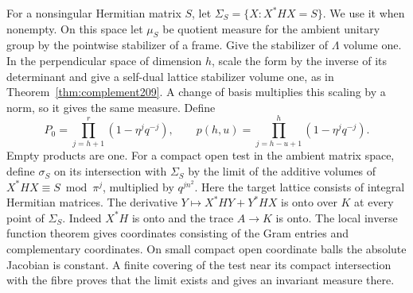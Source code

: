 \documentclass[a4paper,11pt]{article}
\theoremstyle{definition}
\theoremstyle{remark}
\numberwithin{equation}{section}
\begin{document}
For a nonsingular Hermitian matrix \(S\), let
\(\Sigma_S=\{X:X^*HX=S\}\). We use it when nonempty.
On this space let \(\mu_S\) be quotient measure for the ambient
unitary group by the pointwise stabilizer of a frame. Give the
stabilizer of \(\Lambda\) volume one. In the perpendicular space
of dimension \(h\), scale the form by the inverse of its
determinant and give a self-dual lattice stabilizer volume one,
as in Theorem~\ref{thm:complement209}. A change of basis multiplies
this scaling by a norm, so it gives the same measure. Define
\[
 P_0=\prod_{j=h+1}^r(1-\eta^j q^{-j}),\qquad
 p(h,u)=\prod_{j=h-u+1}^h(1-\eta^j q^{-j}).
\]
Empty products are one. For a compact open test in the ambient
matrix space, define \(\sigma_S\) on its intersection with
\(\Sigma_S\) by the limit of the additive volumes of
\(X^*HX\equiv S\bmod\pi^j\), multiplied by \(q^{jn^2}\).
Here the target lattice consists of integral Hermitian matrices.
The derivative \(Y\mapsto X^*HY+Y^*HX\) is onto over \(K\)
at every point of \(\Sigma_S\). Indeed \(X^*H\) is onto and
the trace \(A\to K\) is onto. The local inverse function theorem
gives coordinates consisting of the Gram entries and complementary
coordinates. On small compact open coordinate balls the absolute
Jacobian is constant. A finite covering of the test near its
compact intersection with the fibre proves that the limit exists
and gives an invariant measure there.
\end{document}
